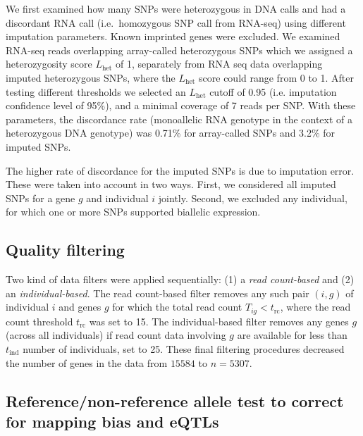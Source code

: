 \documentclass[letterpaper]{article}
\begin{document}
We first examined how many SNPs were heterozygous in DNA calls and had a
discordant RNA call (i.e.~homozygous SNP call from RNA-seq) using different imputation
parameters. Known imprinted genes were excluded. We examined RNA-seq reads
overlapping array-called heterozygous SNPs which we assigned a heterozygosity
score \(L_\mathrm{het}\) of 1, separately from RNA seq data
overlapping imputed heterozygous SNPs, where the \(L_\mathrm{het}\) score could
range from 0 to 1.  After testing different thresholds
we selected an \(L_\mathrm{het}\) cutoff of 0.95 (i.e. imputation confidence
level of 95\%), and a minimal coverage of 7 reads per SNP. With these
parameters, the discordance rate (monoallelic RNA genotype in the context of a
heterozygous DNA genotype) was 0.71\% for array-called SNPs and 3.2\% for
imputed SNPs.

The higher rate of discordance for the imputed SNPs
is due to imputation error.  These were taken into
account in two ways.
First, we considered all imputed SNPs for a gene \(g\) and individual \(i\)
jointly.  Second, we excluded
any individual, for which one or more SNPs supported biallelic
expression.


\subsection{Quality filtering}

\label{sec:filtering}

Two kind of data filters were applied sequentially: (1) a \emph{read
count-based} and (2) an \emph{individual-based}.  The read count-based filter
removes any such pair $(i,g)$ of individual $i$ and genes $g$ for which the
total read count $T_{ig}<t_\mathrm{rc}$, where the read count threshold
$t_\mathrm{rc}$ was set to 15. The individual-based filter removes any genes
$g$ (across all individuals) if read count data involving $g$ are available
for less than $t_\mathrm{ind}$ number of individuals, set to 25.
These final filtering procedures decreased the number of genes in the data from
\(15584\) to \(n=5307\).

\subsection{Reference/non-reference allele test to correct for mapping bias
and eQTLs}
\end{document}
